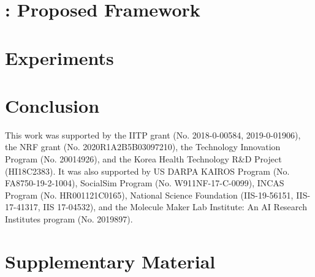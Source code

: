 \documentclass[sigconf]{acmart}
\begin{document}
\section{\proposed: Proposed Framework}
\label{sec:method}


\section{Experiments}
\label{sec:exp}


\section{Conclusion}
\label{sec:conc}


\begin{acks}
This work was supported by the IITP grant (No. 2018-0-00584, 2019-0-01906), the NRF grant (No. 2020R1A2B5B03097210), the Technology Innovation Program (No. 20014926), and the Korea Health Technology R\&D Project (HI18C2383).
It was also supported by US DARPA KAIROS Program (No. FA8750-19-2-1004), SocialSim Program (No. W911NF-17-C-0099), INCAS Program (No. HR001121C0165), National Science Foundation (IIS-19-56151, IIS-17-41317, IIS 17-04532), and the Molecule Maker Lab Institute: An AI Research Institutes program (No. 2019897).
\end{acks}




\newpage
\appendix
\section{Supplementary Material}

\end{document}
